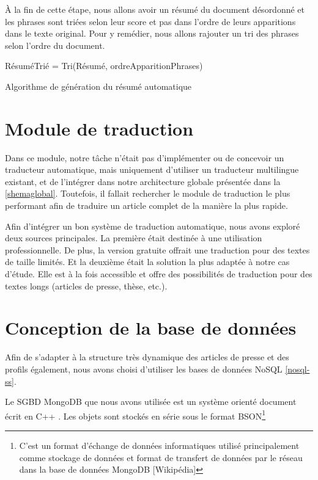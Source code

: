         À la fin de cette étape, nous allons avoir un résumé du document désordonné et les phrases sont triées selon leur score et pas dans l'ordre de leurs apparitions dans le texte original. Pour y remédier, nous allons rajouter un tri des phrases selon l'ordre du document.
        
         \begin{algorithm2e}[H]
             \SetAlgoLined
             RésuméTrié = Tri(Résumé, ordreApparitionPhrases)\\
             \caption{Algorithme de génération du résumé automatique}
         \end{algorithm2e}

\section{Module de traduction}
Dans ce module, notre tâche n'était pas d'implémenter ou de concevoir un traducteur automatique, mais uniquement d'utiliser un traducteur multilingue existant, et de l'intégrer dans notre architecture globale présentée dans la \autoref{shemaglobal}. 
Toutefois, il fallait rechercher le module de traduction le plus performant afin de traduire un article complet de la manière la plus rapide.

Afin d'intégrer un bon système de traduction automatique, nous avons exploré deux sources principales. La première était destinée à une utilisation professionnelle. De plus, la version gratuite offrait une traduction pour des textes de taille limités. Et la deuxième était la solution la plus adaptée à notre cas d'étude. Elle est à la fois accessible et offre des possibilités de traduction pour des textes longs (articles de presse, thèse, etc.). 

\section{Conception de la base de données}\label{concept-bdd}
Afin de s'adapter à la structure très dynamique des articles de presse et des profils également, nous avons choisi d'utiliser les bases de données NoSQL \autoref{nosql-ss}.

Le SGBD MongoDB que nous avons utilisée est un système orienté document écrit en C++ \cite{NOSQL3}. Les objets sont stockés en série sous le format BSON\footnote{C'est un format d'échange de données informatiques utilisé principalement comme stockage de données et format de transfert de données par le réseau dans la base de données MongoDB [Wikipédia]}

